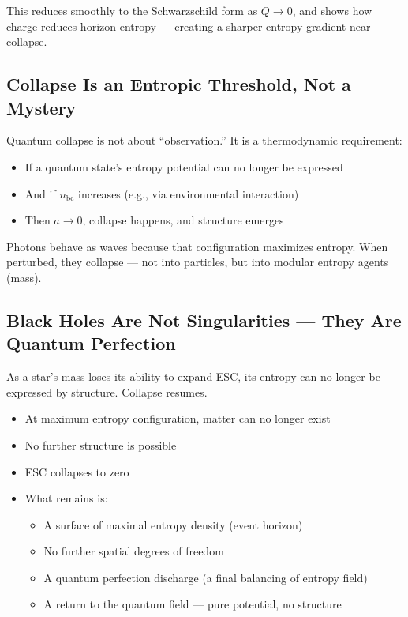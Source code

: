 \documentclass[12pt]{article}
\begin{document}
This reduces smoothly to the Schwarzschild form as $Q \rightarrow 0$, and shows how charge reduces horizon entropy — creating a sharper entropy gradient near collapse.


\subsection{Collapse Is an Entropic Threshold, Not a Mystery}

Quantum collapse is not about ``observation.'' It is a thermodynamic requirement:
\begin{itemize}
    \item If a quantum state’s entropy potential can no longer be expressed
    \item And if $n_{\text{bc}}$ increases (e.g., via environmental interaction)
    \item Then $a \to 0$, collapse happens, and structure emerges
\end{itemize}

Photons behave as waves because that configuration maximizes entropy. When perturbed, they collapse — not into particles, but into modular entropy agents (mass).

\subsection{Black Holes Are Not Singularities — They Are Quantum Perfection}

As a star’s mass loses its ability to expand ESC, its entropy can no longer be expressed by structure. Collapse resumes.

\begin{itemize}
    \item At maximum entropy configuration, matter can no longer exist
    \item No further structure is possible
    \item ESC collapses to zero
    \item What remains is:
    \begin{itemize}
        \item A surface of maximal entropy density (event horizon)
        \item No further spatial degrees of freedom
        \item A quantum perfection discharge (a final balancing of entropy field)
        \item A return to the quantum field — pure potential, no structure
    \end{itemize}
\end{itemize}
\end{document}
